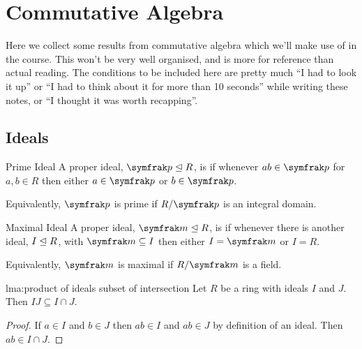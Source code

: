 \chapter{Commutative Algebra}
Here we collect some results from commutative algebra which we'll make use of in the course.
This won't be very well organised, and is more for reference than actual reading.
The conditions to be included here are pretty much \enquote{I had to look it up} or \enquote{I had to think about it for more than 10 seconds} while writing these notes, or \enquote{I thought it was worth recapping}.

\section{Ideals}

\begin{dfn}{Prime Ideal}{}
    A proper ideal, \(\ideal{p} \subideal R\), is  if whenever \(ab \in \ideal{p}\) for \(a, b \in R\) then either \(a \in \ideal{p}\) or \(b \in \ideal{p}\).
    
    Equivalently, \(\ideal{p}\) is prime if \(R/\ideal{p}\) is an integral domain.
\end{dfn}

\begin{dfn}{Maximal Ideal}{}
    A proper ideal, \(\ideal{m} \subideal R\), is  if whenever there is another ideal, \(I \trianglelefteq R\), with \(\ideal{m} \subseteq I\) then either \(I = \ideal{m}\) or \(I = R\).
    
    Equivalently, \(\ideal{m}\) is maximal if \(R/\ideal{m}\) is a field.
\end{dfn}

\begin{lma}{}{lma:product of ideals subset of intersection}
    Let \(R\) be a ring with ideals \(I\) and \(J\).
    Then \(IJ \subseteq I \cap J\).
    \begin{proof}
        If \(a \in I\) and \(b \in J\) then \(ab \in I\) and \(ab \in J\) by definition of an ideal.
        Then \(ab \in I \cap J\).
    \end{proof}
\end{lma}

